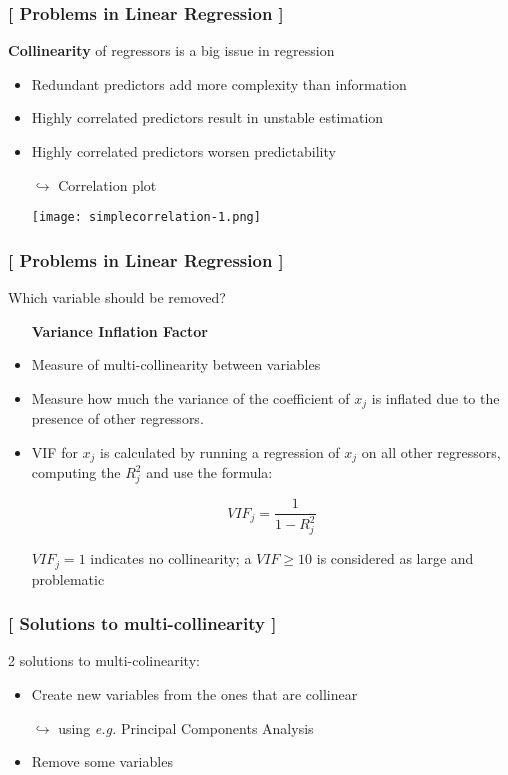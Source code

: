 \documentclass[xcolor=x11names,compress]{beamer}
\renewcommand{\(}{\begin{columns}}
\renewcommand{\)}{\end{columns}}
\newcommand{\<}[1]{\begin{column}{#1}}
\renewcommand{\>}{\end{column}}
\begin{document}
\begin{frame} %
\frametitle{\textcolor{brique}{[ Problems in Linear Regression ]}}
\textbf{Collinearity } of regressors is a big issue in regression
\pause
\begin{itemize}[<+->]
  \item Redundant predictors add more complexity than information
  \item Highly correlated predictors result in unstable estimation
  \item Highly correlated predictors worsen predictability
  \item[$\hookrightarrow$] Correlation plot
  \item[] \texttt{[image: simplecorrelation-1.png]}
\end{itemize}
\end{frame}

\begin{frame} %
\frametitle{\textcolor{brique}{[ Problems in Linear Regression ]}}
 Which variable should be removed?
 \pause
\begin{itemize}[<+->]
  \item[] \textbf{Variance Inflation Factor}
  \item Measure of multi-collinearity between variables
  \item Measure how much the variance of the coefficient of $x_j$ is inflated due to the presence of other regressors.
  \item VIF for  $x_j$ is calculated by running a regression of $x_j$ on all other regressors, computing the $R_j^2$ and use the formula:
  \item[] $$
  VIF_j  = \frac{1}{1 - R^2_j}
  $$
  \item[] $VIF_j = 1$ indicates no collinearity; a $VIF \geq 10$  is considered as large and problematic
\end{itemize}
\end{frame}

\begin{frame} %
\frametitle{\textcolor{brique}{[ Solutions to multi-collinearity ]}}
2 solutions to multi-colinearity:
\pause
\begin{itemize}[<+->]
  \item Create new variables from the ones that are collinear
  \item[$\hookrightarrow$] using \textit{e.g.} Principal Components Analysis
  \item Remove some variables
\end{itemize}
\end{frame}
\end{document}
